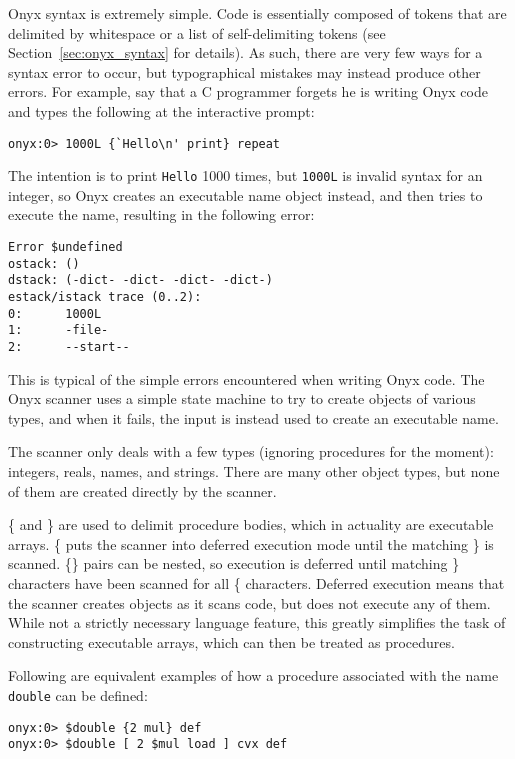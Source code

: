 Onyx syntax is extremely simple.  Code is essentially composed of tokens that
are delimited by whitespace or a list of self-delimiting tokens (see
Section~\ref{sec:onyx_syntax} for details).  As such, there are very few ways
for a syntax error to occur, but typographical mistakes may instead produce
other errors.  For example, say that a C programmer forgets he is writing Onyx
code and types the following at the interactive  prompt:

\begin{verbatim}
onyx:0> 1000L {`Hello\n' print} repeat
\end{verbatim}

The intention is to print {\tt Hello} 1000 times, but {\tt 1000L} is invalid
syntax for an integer, so Onyx creates an executable name object instead, and
then tries to execute the name, resulting in the following error:

\begin{verbatim}
Error $undefined
ostack: ()
dstack: (-dict- -dict- -dict- -dict-)
estack/istack trace (0..2):
0:      1000L
1:      -file-
2:      --start--
\end{verbatim}

This is typical of the simple errors encountered when writing Onyx code.  The
Onyx scanner uses a simple state machine to try to create objects of various
types, and when it fails, the input is instead used to create an executable
name.

The scanner only deals with a few types (ignoring procedures for the moment):
integers, reals, names, and strings.  There are many other object types, but
none of them are created directly by the scanner.

\{ and \} are used to delimit procedure bodies, which in actuality are
executable arrays.  \{ puts the scanner into deferred execution mode until the
matching \} is scanned.  \{\} pairs can be nested, so execution is deferred
until matching \} characters have been scanned for all \{ characters.  Deferred
execution means that the scanner creates objects as it scans code, but does not
execute any of them.  While not a strictly necessary language feature, this
greatly simplifies the task of constructing executable arrays, which can then be
treated as procedures.

Following are equivalent examples of how a procedure associated with the name
{\tt double} can be defined:

\begin{verbatim}
onyx:0> $double {2 mul} def
onyx:0> $double [ 2 $mul load ] cvx def
\end{verbatim}

